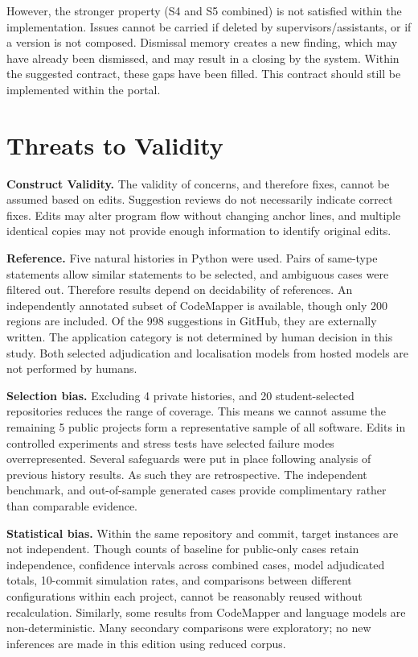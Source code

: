 \documentclass[10pt,conference,letterpaper]{IEEEtran}
\begin{document}
However, the stronger property (S4 and S5 combined) is not satisfied within the implementation. Issues cannot be carried if deleted by supervisors/assistants, or if a version is not composed. Dismissal memory creates a new finding, which may have already been dismissed, and may result in a closing by the system. Within the suggested contract, these gaps have been filled. This contract should still be implemented within the portal.



\section{Threats to Validity}
\textbf{Construct Validity.} The validity of concerns, and therefore fixes, cannot be assumed based on edits. Suggestion reviews do not necessarily indicate correct fixes. Edits may alter program flow without changing anchor lines, and multiple identical copies may not provide enough information to identify original edits.

\textbf{Reference.} Five natural histories in Python were used. Pairs of same-type statements allow similar statements to be selected, and ambiguous cases were filtered out. Therefore results depend on decidability of references. An independently annotated subset of CodeMapper is available, though only 200 regions are included. Of the 998 suggestions in GitHub, they are externally written. The application category is not determined by human decision in this study. Both selected adjudication and localisation models from hosted models are not performed by humans.

\textbf{Selection bias.} Excluding 4 private histories, and 20 student-selected repositories reduces the range of coverage. This means we cannot assume the remaining 5 public projects form a representative sample of all software. Edits in controlled experiments and stress tests have selected failure modes overrepresented. Several safeguards were put in place following analysis of previous history results. As such they are retrospective. The independent benchmark, and out-of-sample generated cases provide complimentary rather than comparable evidence.

\textbf{Statistical bias.} Within the same repository and commit, target instances are not independent. Though counts of baseline for public-only cases retain independence, confidence intervals across combined cases, model adjudicated totals, 10-commit simulation rates, and comparisons between different configurations within each project, cannot be reasonably reused without recalculation. Similarly, some results from CodeMapper and language models are non-deterministic. Many secondary comparisons were exploratory; no new inferences are made in this edition using reduced corpus.
\end{document}
